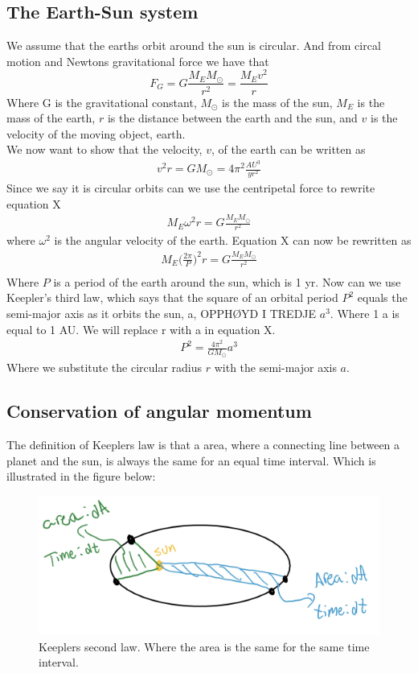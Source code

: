 \documentclass{article}
\begin{document}
\begin{multicols}{2}
\subsection{The Earth-Sun system}
We assume that the earths orbit around the sun is circular. And from circal motion and Newtons gravitational force we have that
\begin{equation}
    F_G=G\frac{M_EM_{\odot}}{r^2}=\frac{M_Ev^2}{r}
\end{equation}
Where G is the gravitational constant, $M_\odot$ is the mass of the sun, $M_E$ is the mass of the earth, $r$ is the distance between the earth and the sun, and $v$ is the velocity of the moving object, earth.\\
We now want to show that the velocity, $v$, of the earth can be written as
\begin{align}
    v^2r=GM_{\odot}=4\pi^2\frac{AU^3}{yr^2}
\end{align}
Since we say it is circular orbits  can we use the centripetal force to rewrite equation X
\begin{align}
    M_E\omega^2r=G\frac{M_EM_{\odot}}{r^2}
\end{align}
where $\omega^2$ is the angular velocity of the earth. Equation X can now be rewritten as 
\begin{align}
    M_E\bigg(\frac{2\pi}{P}\bigg)^2r=G\frac{M_EM_{\odot}}{r^2}\\
\end{align}
Where $P$ is a period of the earth around the sun, which is 1 yr.
Now can we use Keepler's third law, which says that the square of an orbital period $P^2$ equals the semi-major axis as it orbits the sun, a, OPPHØYD I TREDJE $a^3$. Where 1 a is equal to 1 AU. We will replace r with a in equation X.
\begin{align}
    P^2=\frac{4\pi^2}{GM_\odot}a^3
\end{align}
Where we substitute the circular radius $r$ with the semi-major axis $a$. 

\subsection{Conservation of angular momentum}
The definition of Keeplers law is that a area, where a connecting line between a planet and the sun, is always the same for an equal time interval. Which is illustrated in the figure below:


\begin{figure}[H]
	\centering
	\includegraphics[width=\linewidth]{K2L.jpg}
	\caption{Keeplers second law. Where the area is the same for the same time interval.}
	\label{fig:1bplot}
\end{figure}


\end{multicols}
\end{document}
